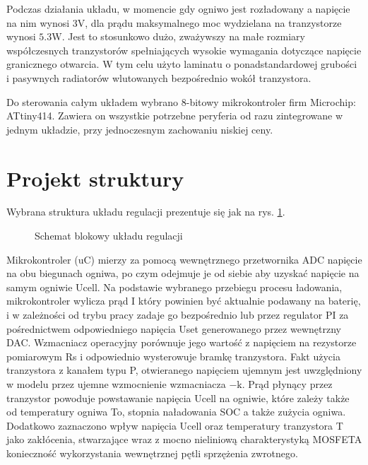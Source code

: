 \documentclass[polish,engineer]{polsl-msth}
\begin{document}
Podczas działania układu, w momencie gdy ogniwo jest rozładowany a napięcie na nim wynosi 3V, dla prądu maksymalnego moc wydzielana na tranzystorze wynosi $5.3\mathrm{W}$. Jest to stosunkowo dużo, zważywszy na małe rozmiary współczesnych tranzystorów spełniających wysokie wymagania dotyczące napięcie granicznego otwarcia. W tym celu użyto laminatu o ponadstandardowej grubości i pasywnych radiatorów wlutowanych bezpośrednio wokół tranzystora.

Do sterowania całym układem wybrano 8-bitowy mikrokontroler firm Microchip: ATtiny414. Zawiera on wszystkie potrzebne peryferia od razu zintegrowane w jednym układzie, przy jednoczesnym zachowaniu niskiej ceny. 
\section{Projekt struktury}
Wybrana struktura układu regulacji prezentuje się jak na rys. \ref{dia:reg_all}. 
\begin{figure}
     \resizebox{\linewidth}{!}{}
     \caption{Schemat blokowy układu regulacji\label{dia:reg_all}}
\end{figure}

Mikrokontroler (uC) mierzy za pomocą wewnętrznego przetwornika ADC napięcie na obu biegunach ogniwa, po czym odejmuje je od siebie aby uzyskać napięcie na samym ogniwie Ucell. Na podstawie wybranego przebiegu procesu ładowania, mikrokontroler wylicza prąd I który powinien być aktualnie podawany na baterię, i w zależności od trybu pracy zadaje go bezpośrednio lub przez regulator PI za pośrednictwem odpowiedniego napięcia Uset generowanego przez wewnętrzny DAC. Wzmacniacz operacyjny porównuje jego wartość z napięciem na rezystorze pomiarowym Rs i odpowiednio wysterowuje bramkę tranzystora. Fakt użycia tranzystora z kanałem typu P, otwieranego napięciem ujemnym jest uwzględniony w modelu przez ujemne wzmocnienie wzmacniacza $\mathrm{-k}$. Prąd płynący przez tranzystor powoduje powstawanie napięcia Ucell na ogniwie, które zależy także od temperatury ogniwa To, stopnia naładowania SOC a także zużycia ogniwa. Dodatkowo zaznaczono wpływ napięcia Ucell oraz temperatury tranzystora T jako zakłócenia, stwarzające wraz z mocno nieliniową charakterystyką MOSFETA konieczność wykorzystania wewnętrznej pętli sprzężenia zwrotnego.
\end{document}
